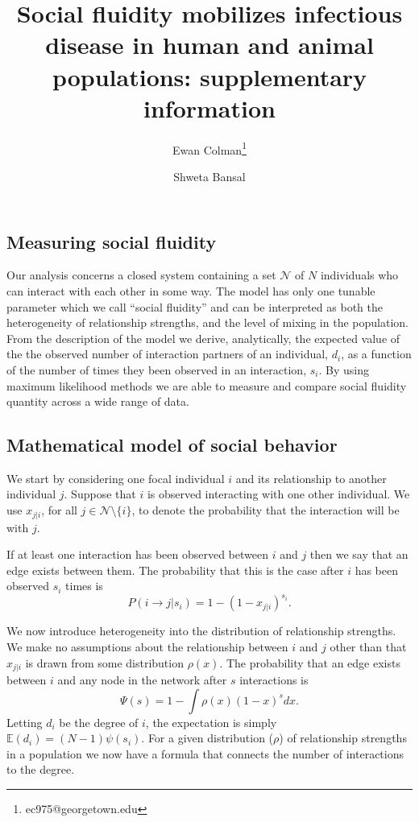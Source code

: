 \documentclass[10pt]{article}
\title{\vspace{-1.5cm}\sffamily Social fluidity mobilizes infectious disease in human and animal populations: supplementary information}
\date{}
\author[1]{Ewan Colman\footnote{ec975@georgetown.edu}}
\affil{\small{Department of Biology, Georgetown University, Washington, DC 20057, U.S.A}}
\author[1]{Shweta Bansal}
\begin{document}
\maketitle
\vspace{-1cm}
{\sffamily\tableofcontents}
\hrulefill

\begin{multicols}{2}
\section{Measuring social fluidity}
Our analysis concerns a closed system containing a set $\mathcal{N}$ of $N$ individuals who can interact with each other in some way. The model has only one tunable parameter which we call ``social fluidity'' and can be interpreted as both the heterogeneity of relationship strengths, and the level of mixing in the population. From the description of the model we derive, analytically, the expected value of the the observed number of interaction partners of an individual, $d_{i}$, as a function of the number of times they been observed in an interaction, $s_{i}$. By using maximum likelihood methods we are able to measure and compare social fluidity quantity across a wide range of data.
 
\subsection{Mathematical model of social behavior}
\label{social_mixing}
We start by considering one focal individual $i$ and its relationship to another individual $j$. Suppose that $i$ is observed interacting with one other individual. We use  $x_{j|i}$, for all $j\in \mathcal{N}\setminus\{i\}$, to denote the probability that the interaction will be with $j$.
 
If at least one interaction has been observed between $i$ and $j$ then we say that an edge exists between them. The probability that this is the case after $i$ has been observed $s_{i}$ times is
\begin{equation}
\label{i_to_j_sup}
P(i \rightarrow j|s_{i})=1-(1-x_{j|i})^{s_{i}}.
\end{equation}

We now introduce heterogeneity into the distribution of relationship strengths. We make no assumptions about the relationship between $i$ and $j$ other than that $x_{j|i}$ is drawn from some distribution $\rho(x)$. The probability that an edge exists between $i$ and any node in the network after $s$ interactions is
\begin{equation}
\label{i_to_any_sup}
\Psi(s)=1-\int\rho(x)(1-x)^{s}dx.
\end{equation}
Letting $d_{i}$ be the degree of $i$, the expectation is simply $\mathbb{E}(d_{i})=(N-1)\psi(s_{i})$. For a given distribution ($\rho$) of relationship strengths in a population we now have a formula that connects the number of interactions to the degree.


\end{multicols}
\end{document}
